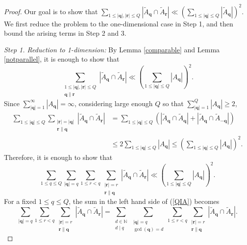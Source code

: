\documentclass[reqno]{amsart}
\theoremstyle{definition}
\theoremstyle{remark}
\begin{document}
\begin{proof}
    Our goal is to show that $\sum_{1 \leq |\mathbf{q}|,|\mathbf{r}| \leq Q} |\tilde A_\mathbf{q} \cap \tilde A_\mathbf{r}| \ll \left( \sum_{1\leq |\mathbf{q}| \leq Q} |\tilde A_\mathbf{q}| \right)^2.$ We first reduce the problem to the one-dimensional case in Step 1, and then bound the arising terms in Step 2 and 3.
    
    \textit{Step 1. Reduction to 1-dimension:} By Lemma \ref{comparable} and Lemma \ref{notparallel}, it is enough to show that
    $$\sum_{\substack{1\leq |\mathbf{q}|,|\mathbf{r}| \leq Q \\ \mathbf{q} \parallel \mathbf{r}}} |\tilde A_\mathbf{q} \cap \tilde A_\mathbf{r}| \ll \left( \sum_{1\leq |\mathbf{q}| \leq Q} |A_\mathbf{q}| \right)^2.$$
    Since $\sum_{|\mathbf{q}|=1}^\infty |A_\mathbf{q}| =\infty$, considering large enough $Q$ so that $\sum_{|\mathbf{q}|=1}^Q |A_\mathbf{q}| \geq 2$,
    \begin{align*}
        \sum_{1\leq |\mathbf{q}| \leq Q} \sum_{\substack{|\mathbf{r}| = |\mathbf{q}| \\ \mathbf{r} \parallel \mathbf{q}}} |\tilde A_\mathbf{q} \cap \tilde A_\mathbf{r}| &= \sum_{1\leq |\mathbf{q}| \leq Q} \left( |\tilde A_\mathbf{q} \cap \tilde A_\mathbf{q}| + |\tilde A_\mathbf{q} \cap \tilde A_\mathbf{-q}| \right) \\
        &\leq 2 \sum_{1\leq |\mathbf{q}| \leq Q} |A_\mathbf{q}| \leq \left( \sum_{1\leq |\mathbf{q}| \leq Q} |A_\mathbf{q}| \right)^2.
    \end{align*}
    Therefore, it is enough to show that
    \begin{equation}\label{QIA}
        \sum_{1\leq q \leq Q} \sum_{|\mathbf{q}|=q} \sum_{1\leq r < q} \sum_{\substack{|\mathbf{r}| = r \\ \mathbf{r} \parallel \mathbf{q}}} |\tilde A_\mathbf{q} \cap \tilde A_\mathbf{r}| \ll \left( \sum_{1\leq |\mathbf{q}| \leq Q} |A_\mathbf{q}| \right)^2.
    \end{equation}
    For a fixed $1 \leq q\leq Q$, the sum in the left hand side of (\ref{QIA}) becomes
    \begin{equation}\label{qfixed}
        \sum_{|\mathbf{q}|=q} \sum_{1\leq r<q} \sum_{\substack{|\mathbf{r}| = r \\ \mathbf{r} \parallel \mathbf{q}}} |\tilde A_\mathbf{q} \cap \tilde A_\mathbf{r}| = \sum_{\substack{d \in \mathbb{N} \\ d \mid q}} \sum_{\substack{|\mathbf{q}|= q \\ \gcd(\mathbf{q}) = d}} \sum_{1\leq r < q} \sum_{\substack{|\mathbf{r}| = r \\ \mathbf{r} \parallel \mathbf{q}}} |\tilde A_\mathbf{q} \cap \tilde A_\mathbf{r}|.

\end{equation}
\end{proof}
\end{document}
